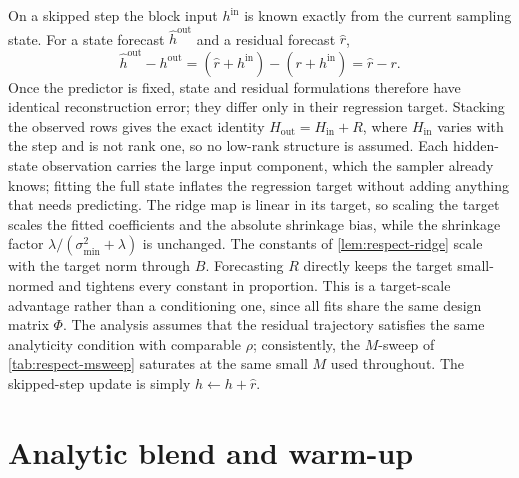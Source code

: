 On a skipped step the block input $h^{\mathrm{in}}$ is known exactly from the current sampling state. For a state forecast $\hat h^{\mathrm{out}}$ and a residual forecast $\hat r$,
\begin{equation}
  \hat h^{\mathrm{out}} - h^{\mathrm{out}} = (\hat r + h^{\mathrm{in}}) - (r + h^{\mathrm{in}}) = \hat r - r .
\end{equation}
Once the predictor is fixed, state and residual formulations therefore have identical reconstruction error; they differ only in their regression target. Stacking the observed rows gives the exact identity $H_{\mathrm{out}} = H_{\mathrm{in}} + R$, where $H_{\mathrm{in}}$ varies with the step and is not rank one, so no low-rank structure is assumed. Each hidden-state observation carries the large input component, which the sampler already knows; fitting the full state inflates the regression target without adding anything that needs predicting. The ridge map is linear in its target, so scaling the target scales the fitted coefficients and the absolute shrinkage bias, while the shrinkage factor $\lambda/(\sigma_{\min}^2+\lambda)$ is unchanged. The constants of \cref{lem:respect-ridge} scale with the target norm through $B$. Forecasting $R$ directly keeps the target small-normed and tightens every constant in proportion. This is a target-scale advantage rather than a conditioning one, since all fits share the same design matrix $\Phi$. The analysis assumes that the residual trajectory satisfies the same analyticity condition with comparable $\rho$; consistently, the $M$-sweep of \cref{tab:respect-msweep} saturates at the same small $M$ used throughout. The skipped-step update is simply $h\leftarrow h+\hat r$.

\section{Analytic blend and warm-up}\label{sec:respect-blend}

